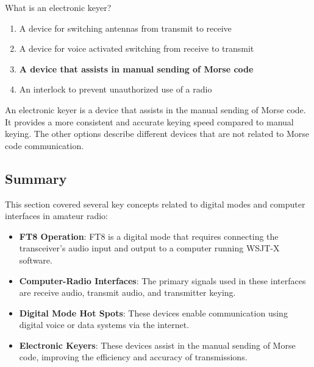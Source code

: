 \begin{tcolorbox}[colback=gray!10!white,colframe=black!75!black,title={T4A12}]
    What is an electronic keyer?
    \begin{enumerate}[label=\Alph*,noitemsep]
        \item A device for switching antennas from transmit to receive
        \item A device for voice activated switching from receive to transmit
        \item \textbf{A device that assists in manual sending of Morse code}
        \item An interlock to prevent unauthorized use of a radio
    \end{enumerate}
\end{tcolorbox}
An electronic keyer is a device that assists in the manual sending of Morse code. It provides a more consistent and accurate keying speed compared to manual keying. The other options describe different devices that are not related to Morse code communication.


\subsection*{Summary}
This section covered several key concepts related to digital modes and computer interfaces in amateur radio:
\begin{itemize}
    \item \textbf{FT8 Operation}: FT8 is a digital mode that requires connecting the transceiver's audio input and output to a computer running WSJT-X software.
    \item \textbf{Computer-Radio Interfaces}: The primary signals used in these interfaces are receive audio, transmit audio, and transmitter keying.
    \item \textbf{Digital Mode Hot Spots}: These devices enable communication using digital voice or data systems via the internet.
    \item \textbf{Electronic Keyers}: These devices assist in the manual sending of Morse code, improving the efficiency and accuracy of transmissions.
\end{itemize}
